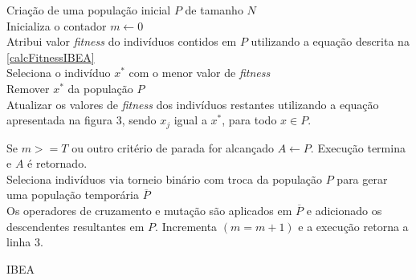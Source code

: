 \documentclass[conference]{IEEEtran}
\begin{document}
\begin{algorithm}[h]
	
	
	Criação de uma população inicial $P$ de tamanho $N$\\
	Inicializa o contador $m \gets 0$\\
	Atribui valor \textit{fitness} do indivíduos contidos em $P$ utilizando a equação descrita na \ref{calcFitnessIBEA}\\ 	
	
	 { 
		Seleciona o indivíduo $x^*$ com o menor valor de \textit{fitness}\\
		Remover $x^*$ da população $P$\\
		Atualizar os valores de \textit{fitness} dos indivíduos restantes utilizando a equação apresentada na figura 3, sendo $x_j$ igual a $x^*$, para todo $x \in P$.\\
	}
	
	
	Se $m >= T$ ou outro critério de parada for alcançado $A \gets P$. Execução termina e $A$ é retornado. \\
	
	Seleciona indivíduos via torneio binário  com troca da população $P$ para gerar uma população temporária $\overline P$\\
	
	Os operadores de cruzamento e mutação  são aplicados em $\overline P$ e adicionado os descendentes resultantes em $P$. Incrementa $(m = m+1)$ e a execução retorna a linha 3.
	\caption{IBEA}
\end{algorithm}%

\end{document}

